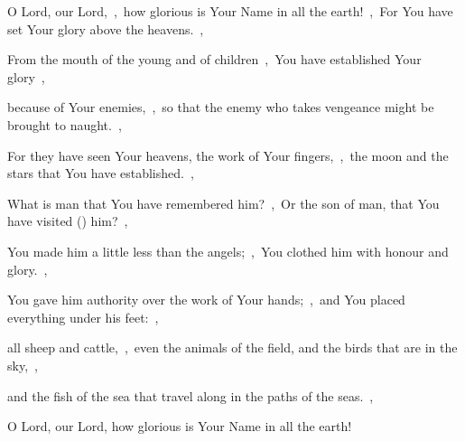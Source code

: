 \documentclass[12pt,twoside,a5paper]{article}
\begin{document}



\begin{normalparskip}
  O Lord, our Lord,~\sep\ how glorious is Your Name in all the earth!~\sep\ For You have set Your glory above the heavens.~\sep


  From the mouth of the young and of children~\sep\ You have established Your glory~\sep

  because of Your enemies,~\sep\ so that the enemy who takes vengeance might be brought to naught.~\sep

  For they have seen Your heavens, the work of Your fingers,~\sep\ the moon and the stars that You have established.~\sep

  What is man that You have remembered him?~\sep\ Or the son of man, that You have visited () him?~\sep

  You made him a little less than the angels;~\sep\ You clothed him with honour and glory.~\sep

  You gave him authority over the work of Your hands;~\sep\ and You placed everything under his feet:~\sep

  all sheep and cattle,~\sep\ even the animals of the field, and the birds that are in the sky,~\sep

  and the fish of the sea that travel along in the paths of the seas.~\sep

  O Lord, our Lord, how glorious is Your Name in all the earth!
\end{normalparskip}

\end{document}
